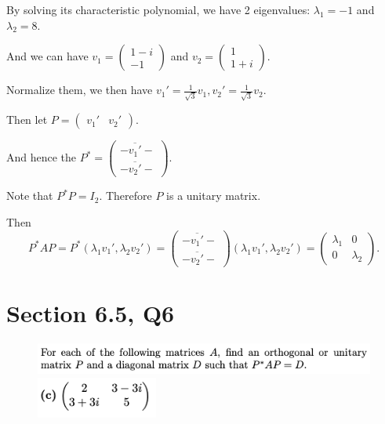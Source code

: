 \documentclass[12pt]{article}%
\begin{document}
By solving its characteristic polynomial, we have 2 eigenvalues: $\lambda_1=-1$ and $\lambda_2=8.$

And we can have $v_1=\begin{pmatrix} 1-i\\-1 \end{pmatrix}$ and 
$v_2=\begin{pmatrix} 1\\1+i \end{pmatrix}.$

Normalize them, we then have $v_1'=\frac{1}{\sqrt{3}}v_1,v_2'=\frac{1}{\sqrt{3}}v_2.$

Then let $P=\begin{pmatrix} v_1'& v_2' \end{pmatrix}.$ 

And hence the 
$P^*=\begin{pmatrix} -\overline{v_1'}-\\-\overline{v_2'}-  \end{pmatrix}.$

Note that $P^*P=I_2.$ Therefore $P$ is a unitary matrix.

Then $$P^*AP=P^*(\lambda_1 v_1', \lambda_2 v_2')=
\begin{pmatrix} -\overline{v_1'}-\\-\overline{v_2'}-  \end{pmatrix}(\lambda_1 v_1', \lambda_2 v_2')
=\begin{pmatrix} \lambda_1&0\\0&\lambda_2 \end{pmatrix}.$$


\newpage

\section{Section 6.5, Q6}
\begin{figure}[htp]
    \centering %
    \includegraphics[width = 16cm]{img/Q8a.png}
    \includegraphics[width = 4cm]{img/Q8b.png}
\end{figure}
\end{document}
